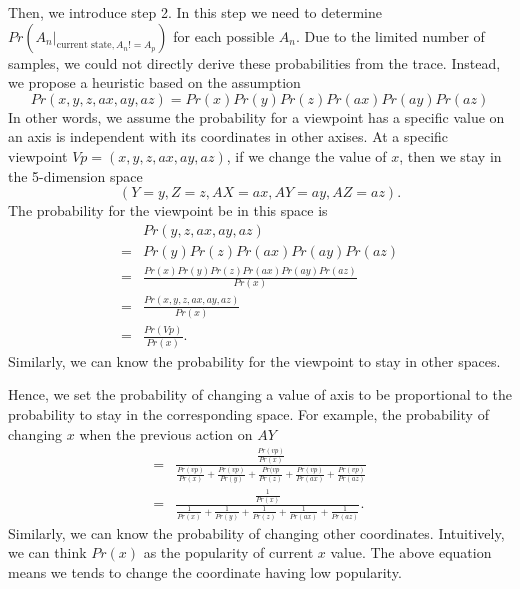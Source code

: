 Then, we introduce step 2. In this step we need to determine $Pr(A_n |_{\textrm{current state}, A_n != A_p})$
for each possible $A_n$. Due to the limited number of samples, we could not directly derive these probabilities
from the trace. Instead, we propose a heuristic based on the assumption
\[
    Pr(x, y, z, ax, ay, az) = Pr(x)Pr(y)Pr(z)Pr(ax)Pr(ay)Pr(az)
\]
In other words, we assume the probability for a viewpoint has a specific value on an axis is independent with its 
coordinates in other axises.
At a specific viewpoint $Vp = (x, y, z, ax, ay, az)$, 
if we change the value of $x$, then we stay in the 5-dimension space
\[
    (Y=y, Z=z, AX=ax, AY=ay, AZ=az).
\]
The probability for the viewpoint be in this space is 
\begin{align*}
    &Pr(y, z, ax, ay, az)\\
    =&Pr(y)Pr(z)Pr(ax)Pr(ay)Pr(az)\\
    =&\frac{Pr(x)Pr(y)Pr(z)Pr(ax)Pr(ay)Pr(az)}{Pr(x)}\\
    =&\frac{Pr(x, y, z, ax, ay, az)}{Pr(x)}\\
    =&\frac{Pr(Vp)}{Pr(x)}.
\end{align*}
Similarly, we can know the probability for the viewpoint to stay in other spaces. 

Hence, we set the probability of changing a value of axis to be proportional to the probability to stay in the
corresponding space. For example, the probability of changing $x$ when the previous action on $AY$
\begin{align*}
    =&\frac{\frac{Pr(vp)}{Pr(x)}}
            {\frac{Pr(vp)}{Pr(x)}
            +\frac{Pr(vp)}{Pr(y)}
            +\frac{Pr(vp}{Pr(z)}
            +\frac{Pr(vp)}{Pr(ax)}
            +\frac{Pr(vp)}{Pr(az)}}\\
    =& \frac{\frac{1}{Pr(x)}}
            {\frac{1}{Pr(x)}
            +\frac{1}{Pr(y)}
            +\frac{1}{Pr(z)}
            +\frac{1}{Pr(ax)}
            +\frac{1}{Pr(az)}
            }.
\end{align*}
Similarly, we can know the probability of changing other coordinates. Intuitively, we can think $Pr(x)$ as 
the popularity of current $x$ value. The above equation means we tends to change the coordinate having low
popularity.




